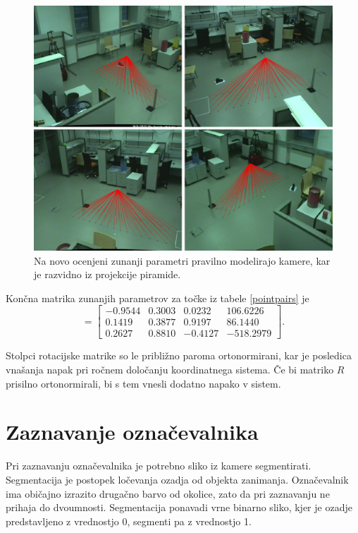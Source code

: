 \documentclass[a4paper, 12pt]{book}
\begin{document}
\begin{figure}[H]
\centering
\includegraphics[scale=0.25]{reprojection_corrected.png}
\caption{Na novo ocenjeni zunanji parametri pravilno modelirajo kamere, kar je razvidno iz projekcije piramide.}
\end{figure}

Končna matrika zunanjih parametrov za točke iz tabele \ref{pointpairs} je
\begin{equation}
[R|\vec{T}] = 
\begin{bmatrix}
-0.9544 & 0.3003 & 0.0232 & 106.6226 \\
0.1419 & 0.3877 & 0.9197 & 86.1440 \\
0.2627 & 0.8810 & -0.4127 & -518.2979 
\end{bmatrix}.
\end{equation}

Stolpci rotacijske matrike so le približno paroma ortonormirani, kar je posledica vnašanja napak pri ročnem določanju koordinatnega sistema. Če bi matriko $R$ prisilno ortonormirali, bi s tem vnesli dodatno napako v sistem.

\section{Zaznavanje označevalnika}\label{markersection}
Pri zaznavanju označevalnika je potrebno sliko iz kamere segmentirati. Segmentacija je postopek ločevanja ozadja od objekta zanimanja. Označevalnik ima običajno izrazito drugačno barvo od okolice, zato da pri zaznavanju ne prihaja do dvoumnosti. Segmentacija ponavadi vrne binarno sliko, kjer je ozadje predstavljeno z vrednostjo 0, segmenti pa z vrednostjo 1. 
\end{document}
